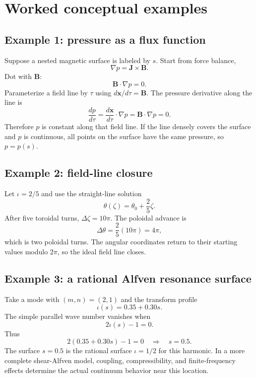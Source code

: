 \section{Worked conceptual examples}
\label{sec:worked_examples}

\subsection{Example 1: pressure as a flux function}
Suppose a nested magnetic surface is labeled by $s$. Start from force balance,
\begin{equation}
\nabla p=\mathbf J\times\mathbf B.
\end{equation}
Dot with $\mathbf B$:
\begin{equation}
\mathbf B\cdot\nabla p=0.
\end{equation}
Parameterize a field line by $\tau$ using $d\mathbf x/d\tau=\mathbf B$. The pressure derivative along the line is
\begin{equation}
\frac{dp}{d\tau}
=\frac{d\mathbf x}{d\tau}\cdot\nabla p
=\mathbf B\cdot\nabla p
=0.
\end{equation}
Therefore $p$ is constant along that field line. If the line densely covers the surface and $p$ is continuous, all points on the surface have the same pressure, so $p=p(s)$.

\subsection{Example 2: field-line closure}
Let $\iota=2/5$ and use the straight-line solution
\begin{equation}
\theta(\zeta)=\theta_0+\frac{2}{5}\zeta.
\end{equation}
After five toroidal turns, $\Delta\zeta=10\pi$. The poloidal advance is
\begin{equation}
\Delta\theta=\frac{2}{5}(10\pi)=4\pi,
\end{equation}
which is two poloidal turns. The angular coordinates return to their starting values modulo $2\pi$, so the ideal field line closes.

\subsection{Example 3: a rational Alfven resonance surface}
Take a mode with $(m,n)=(2,1)$ and the transform profile
\begin{equation}
\iota(s)=0.35+0.30s.
\end{equation}
The simple parallel wave number vanishes when
\begin{equation}
2\iota(s)-1=0.
\end{equation}
Thus
\begin{equation}
2(0.35+0.30s)-1=0
\quad\Rightarrow\quad
s=0.5.
\end{equation}
The surface $s=0.5$ is the rational surface $\iota=1/2$ for this harmonic. In a more complete shear-Alfven model, coupling, compressibility, and finite-frequency effects determine the actual continuum behavior near this location.

